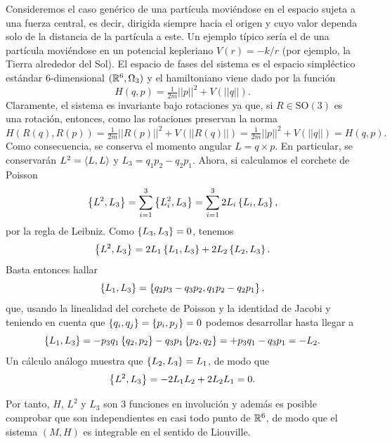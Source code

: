   Consideremos el caso genérico de una partícula moviéndose en el espacio sujeta a una fuerza central, es decir, dirigida siempre hacia el origen y cuyo valor dependa solo de la distancia de la partícula a este. Un ejemplo típico sería el de una partícula moviéndose en un potencial kepleriano $V(r)=-k/r$ (por ejemplo, la Tierra alrededor del Sol). El espacio de fases del sistema es el espacio simpléctico estándar $6$-dimensional $(\mathbb{R}^6,\Omega_3)$ y el hamiltoniano viene dado por la función
  \begin{equation*}
    H(q,p)=\tfrac{1}{2m}||p||^2+V(||q||).
  \end{equation*}
  Claramente, el sistema es invariante bajo rotaciones ya que, si $R\in \mathrm{SO}(3)$ es una rotación, entonces, como las rotaciones preservan la norma
  \begin{equation*}
    H(R(q),R(p))=\tfrac{1}{2m}||R(p)||^2+V(||R(q)||)=\tfrac{1}{2m}||p||^2+V(||q||)=H(q,p).
  \end{equation*}
  Como consecuencia, se conserva el momento angular $L=q\times p$. En particular, se conservarán $L^2=\left\langle L,L\right\rangle$ y $L_3=q_1p_2-q_2p_1$. Ahora, si calculamos el corchete de Poisson
  \begin{equation*}
    \left\lbrace L^2,L_3\right\rbrace=\sum_{i=1}^3\left\lbrace L_i^2,L_3\right\rbrace=\sum_{i=1}^32L_i\left\lbrace L_i,L_3\right\rbrace,
  \end{equation*}
  por la regla de Leibniz. Como $\left\lbrace L_3,L_3\right\rbrace=0$, tenemos 
  \begin{equation*}
    \left\lbrace L^2,L_3\right\rbrace=2L_1\left\lbrace L_1,L_3\right\rbrace+2L_2\left\lbrace L_2,L_3\right\rbrace.
  \end{equation*}
  Basta entonces hallar 
  \begin{equation*}
    \left\lbrace L_1,L_3\right\rbrace=\left\lbrace q_2p_3-q_3p_2,q_1p_2-q_2p_1\right\rbrace,
  \end{equation*}
  que, usando la linealidad del corchete de Poisson y la identidad de Jacobi y teniendo en cuenta que $\left\lbrace q_i,q_j\right\rbrace=\left\lbrace p_i,p_j\right\rbrace=0$ podemos desarrollar hasta llegar a
  \begin{equation*}
    \left\lbrace L_1,L_3\right\rbrace=-p_3q_1\left\lbrace q_2,p_2\right\rbrace-q_3p_1\left\lbrace p_2,q_2\right\rbrace=+p_3q_1-q_3p_1=-L_2.
  \end{equation*}
Un cálculo análogo muestra que $\left\lbrace L_2,L_3\right\rbrace=L_1$, de modo que
\begin{equation*}
  \left\lbrace L^2,L_3\right\rbrace=-2L_1L_2+2L_2L_1=0.
\end{equation*}

Por tanto, $H$, $L^2$ y $L_3$ son $3$ funciones en involución y además es posible comprobar que son independientes en casi todo punto de $\mathbb{R}^6$, de modo que el sistema $(M,H)$ es integrable en el sentido de Liouville.

